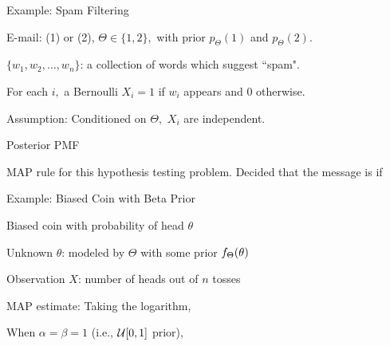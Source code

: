 \begin{frame}{Example: Spam Filtering}

\hfill {}
  \plitemsep 0.05in
\bci
\item<1-> E-mail:  (1) or  (2), $\Theta  \in \{1,2\},$ with prior $p_{\Theta}(1)$ and  $p_{\Theta}(2).$

\item<1-> $\{w_1, w_2, \ldots, w_n \}$: a collection of words which suggest ``spam".

\item<1-> For each $i,$ a Bernoulli $X_i=1$ if $w_i$ appears and 0 otherwise.

\item<1-> Assumption: Conditioned on $\Theta,$ $X_i$ are independent.

\item<1-> Posterior PMF
\item<2-> MAP rule for this hypothesis testing problem. Decided that the message is  if
\eci

\end{frame}





\begin{frame}{Example: Biased Coin with Beta Prior}

\hfill {}

  \plitemsep 0.05in
\bci

\item<1-> Biased coin with probability of head $\theta$
\item<1-> Unknown $\theta$: modeled by $\Theta$ with some prior $f_\Theta(\theta)$
\item<1-> Observation $X$: number of heads out of $n$ tosses
\item<2-> MAP estimate: Taking the logarithm,

\item<4-> When $\alpha=\beta =1$ (i.e., $\mathcal U[0,1]$ prior), 

\eci

\end{frame}



